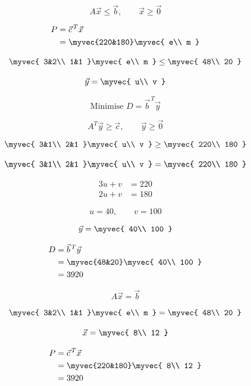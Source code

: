 \begin{enumerate}[label=\thesubsection.\arabic*, ref=\thesubsection.\theenumi]
\[
A\vec{x}\leq\vec{b},
\qquad
\vec{x}\geq\vec{0}
\]

\[
\begin{aligned}
P
&=\vec{c}^{\,T}\vec{x}\\
&=\myvec{220&180}
\myvec{
e\\
m
}
\end{aligned}
\]

\[
\myvec{
3&2\\
1&1
}
\myvec{
e\\
m
}
\leq
\myvec{
48\\
20
}
\]

\[
\vec{y}=\myvec{
u\\
v
}
\]

\[
\text{Minimise } D=\vec{b}^{\,T}\vec{y}
\]

\[
A^T\vec{y}\geq\vec{c},
\qquad
\vec{y}\geq\vec{0}
\]

\[
\myvec{
3&1\\
2&1
}
\myvec{
u\\
v
}
\geq
\myvec{
220\\
180
}
\]

\[
\myvec{
3&1\\
2&1
}
\myvec{
u\\
v
}
=
\myvec{
220\\
180
}
\]

\[
\begin{aligned}
3u+v&=220\\
2u+v&=180
\end{aligned}
\]

\[
u=40,\qquad v=100
\]

\[
\vec{y}=\myvec{
40\\
100
}
\]

\[
\begin{aligned}
D
&=\vec{b}^{\,T}\vec{y}\\
&=\myvec{48&20}
\myvec{
40\\
100
}\\
&=3920
\end{aligned}
\]

\[
A\vec{x}=\vec{b}
\]

\[
\myvec{
3&2\\
1&1
}
\myvec{
e\\
m
}
=
\myvec{
48\\
20
}
\]

\[
\vec{x}=\myvec{
8\\
12
}
\]

\[
\begin{aligned}
P
&=\vec{c}^{\,T}\vec{x}\\
&=\myvec{220&180}
\myvec{
8\\
12
}\\
&=3920
\end{aligned}
\]


\end{enumerate}
